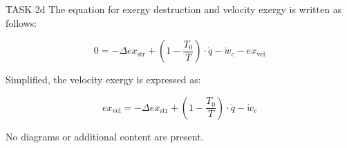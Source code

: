 TASK 2d  
The equation for exergy destruction and velocity exergy is written as follows:

\[
0 = -\Delta ex_{\text{str}} + \left(1 - \frac{T_0}{T}\right) \cdot \dot{q} - \dot{w}_c - ex_{\text{vel}}
\]

Simplified, the velocity exergy is expressed as:

\[
ex_{\text{vel}} = -\Delta ex_{\text{str}} + \left(1 - \frac{T_0}{T}\right) \cdot \dot{q} - \dot{w}_c
\]  

No diagrams or additional content are present.
